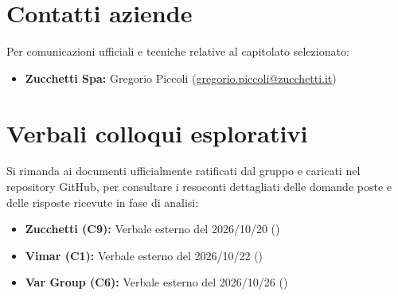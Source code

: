 \documentclass[a4paper, 11pt]{article}
\begin{document}
\newpage

\appendix
\section{Contatti aziende}
Per comunicazioni ufficiali e tecniche relative al capitolato selezionato:
\begin{itemize}[label=-]
    \item \textbf{Zucchetti Spa:} Gregorio Piccoli (\href{mailto:gregorio.piccoli@zucchetti.it}{gregorio.piccoli@zucchetti.it})
\end{itemize}

\section{Verbali colloqui esplorativi}
Si rimanda ai documenti ufficialmente ratificati dal gruppo e caricati nel repository GitHub, per consultare i resoconti dettagliati delle domande poste e delle risposte ricevute in fase di analisi:
\begin{itemize}[label=-]
    \item \textbf{Zucchetti (C9):} Verbale esterno del 2026/10/20 ()
    \item \textbf{Vimar (C1):} Verbale esterno del 2026/10/22 ()
    \item \textbf{Var Group (C6):} Verbale esterno del 2026/10/26 ()
\end{itemize}
\end{document}
